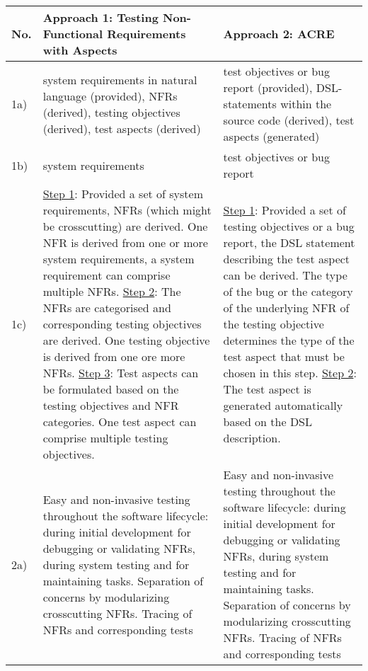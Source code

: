 \newpage
{}
\begin{landscape}
\begin{small}
\begin{table}
\caption{Synthesis Matrix.}
\begin{longtable}{>{\raggedright}p{0.5cm}|>{}p{11cm}|>{}p{11cm}}
\hline
\textbf{No. }
& \textbf{Approach 1: Testing Non-Functional Requirements with Aspects} 
& \textbf{Approach 2: ACRE}\\ \hline
1a) 
& system requirements in natural language (provided), NFRs (derived), testing objectives (derived), test aspects (derived)
& test objectives or bug report (provided), DSL-statements within the source code (derived), test aspects (generated)\\ 
\hline
1b)
&  system requirements 
& test objectives or bug report\\ 
\hline
1c)
&  \underline{Step 1}: Provided a set of system requirements, NFRs (which might be crosscutting) are derived. One NFR is derived from one or more system requirements, a system requirement can comprise multiple NFRs. \underline{Step 2}: The NFRs are categorised and corresponding testing objectives are derived. One testing objective is derived from one ore more NFRs. \underline{Step 3}: Test aspects can be formulated based on the testing objectives and NFR categories. One test aspect can comprise multiple testing objectives.
& \underline{Step 1}: Provided a set of testing objectives or a bug report, the DSL statement describing the test aspect can be derived. The type of the bug or the category of the underlying NFR of the testing objective determines the type of the test aspect that must be chosen in this step. \underline{Step 2}: The test aspect is generated automatically based on the DSL description.\\
\hline %
2a) 
& Easy and non-invasive testing throughout the software lifecycle: during initial development for debugging or validating NFRs, during system testing and for maintaining tasks. Separation of concerns by modularizing crosscutting NFRs. Tracing of NFRs and corresponding tests 
& Easy and non-invasive testing throughout the software lifecycle: during initial development for debugging or validating NFRs, during system testing and for maintaining tasks. Separation of concerns by modularizing crosscutting NFRs. Tracing of NFRs and corresponding tests\\ 
\hline

\end{longtable}
\end{table}
\end{small}
\end{landscape}
